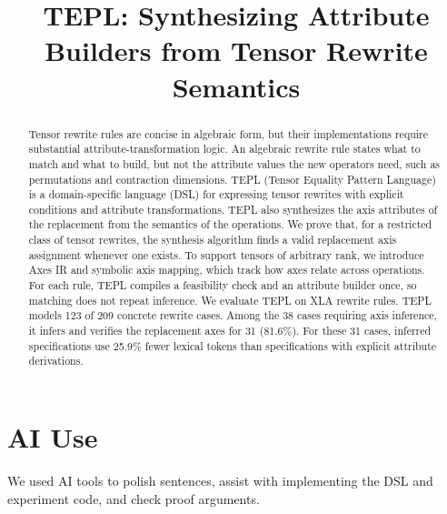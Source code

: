 \documentclass[acmsmall,review,screen,nonacm,anonymous]{acmart}
\title[TEPL]{TEPL: Synthesizing Attribute Builders from Tensor Rewrite Semantics}
\begin{document}
\begin{abstract}
Tensor rewrite rules are concise in algebraic form, but their implementations
require substantial attribute-transformation logic. An algebraic rewrite rule states what to match
and what to build, but not the attribute values the new operators need, such as
permutations and contraction dimensions.
TEPL (Tensor Equality Pattern Language) is a domain-specific language (DSL) for
expressing tensor rewrites with explicit conditions and attribute transformations.
TEPL also synthesizes the axis attributes of the replacement from the semantics of the operations.
We prove that, for a restricted class of tensor rewrites, the synthesis algorithm finds a valid replacement axis assignment whenever one exists.
To support tensors of arbitrary rank, we introduce Axes IR and symbolic axis mapping, which track how axes relate across operations.
For each rule, TEPL compiles a feasibility check and an attribute builder once, so matching does not repeat inference.
We evaluate TEPL on XLA rewrite rules. TEPL
models 123 of 209 concrete rewrite cases. Among the 38 cases requiring axis
inference, it infers and verifies the replacement axes for 31 (81.6\%). For
these 31 cases, inferred specifications use 25.9\% fewer lexical tokens
than specifications with explicit attribute derivations.
\end{abstract}
\maketitle















\section*{AI Use}
We used AI tools to polish sentences, assist with implementing the DSL and
experiment code, and check proof arguments.

\label{main-text-end}
\clearpage
\begingroup
\makeatletter
\let\ACM@linecountL\@empty
\let\ACM@linecountR\@empty
\makeatother


\clearpage
\endgroup
\appendix

\clearpage


\end{document}
